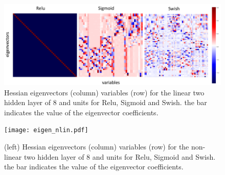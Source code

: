 \documentclass[5p]{elsarticle}
\begin{document}
\begin{figure}[t!]
	\centering
		\includegraphics[width=\textwidth]{eigen_lin.pdf}

\caption{  \label{fig:eigvect} Hessian eigenvectors (column) variables (row) for the linear two hidden layer of 8 and units for Relu, Sigmoid and Swish. the bar indicates the value of the eigenvector coefficients.}
\end{figure}

\begin{figure}[t!]
	\centering
	\texttt{[image: eigen\_nlin.pdf]}

	\caption{  \label{fig:eigvect2}(left) Hessian eigenvectors (column) variables (row) for the non-linear two hidden layer of 8 and units for Relu, Sigmoid and Swish. the bar indicates the value of the eigenvector coefficients.}
\end{figure}
\end{document}
